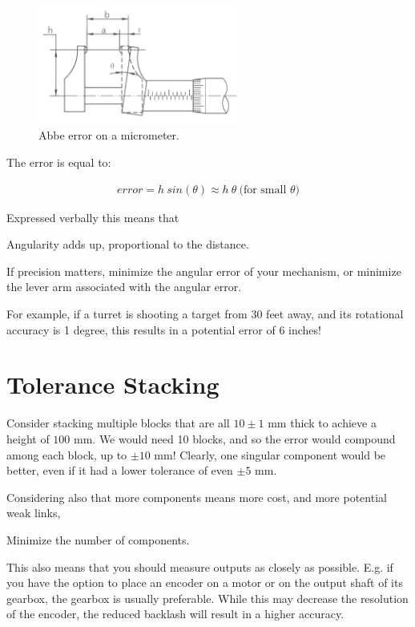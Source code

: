 \begin{figure}[H]
	\includegraphics[width=0.6\textwidth]{imgs/abbe_error.png}
	\caption{Abbe error on a micrometer.}
\end{figure}

The error is equal to:

\begin{align}
	error = h \ sin(\theta) \approx h \ \theta \ \mbox{(for small $\theta$)}
\end{align}

Expressed verbally this means that

\begin{theorem} \label{theorem:abbe}
Angularity adds up, proportional to the distance.
\end{theorem}

If precision matters, minimize the angular error of your mechanism, or minimize the lever arm associated with the angular error.

For example, if a turret is shooting a target from 30 feet away, and its rotational accuracy is 1 degree, this results in a potential error of 6 inches!

\section{Tolerance Stacking}

Consider stacking multiple blocks that are all $10 \pm 1$ mm thick to achieve a height of $100$ mm. We would need 10 blocks, and so the error would compound among each block, up to $\pm 10$ mm! Clearly, one singular component would be better, even if it had a lower tolerance of even $\pm 5$ mm.

Considering also that more components means more cost, and more potential weak links,

\begin{theorem}
Minimize the number of components.
\end{theorem}

This also means that you should measure outputs as closely as possible. E.g. if you have the option to place an encoder on a motor or on the output shaft of its gearbox, the gearbox is usually preferable. While this may decrease the resolution of the encoder, the reduced backlash will result in a higher accuracy.


